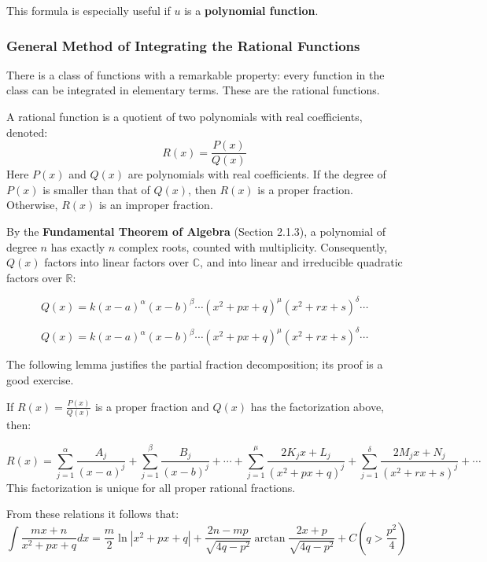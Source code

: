 This formula is especially useful if $u$ is a \textbf{polynomial function}.

\subsubsection{General Method of Integrating the Rational Functions}

There is a class of functions with a remarkable property: every function in the class can be integrated in elementary terms. These are the rational functions.

\begin{definition}
A rational function is a quotient of two polynomials with real coefficients, denoted:
\[
R(x) = \frac{P(x)}{Q(x)}
\]
Here $P(x)$ and $Q(x)$ are polynomials with real coefficients. If the degree of $P(x)$ is smaller than that of $Q(x)$, then $R(x)$ is a proper fraction. Otherwise, $R(x)$ is an improper fraction.
\end{definition}

By the \textbf{Fundamental Theorem of Algebra} (Section 2.1.3), a polynomial of degree $n$ has exactly $n$ complex roots, counted with multiplicity. Consequently, $Q(x)$ factors into linear factors over $\mathbb{C}$, and into linear and irreducible quadratic factors over $\mathbb{R}$:

\[
Q(x) = k (x-a)^{\alpha} (x-b)^{\beta} \cdots (x^2 + px + q)^{\mu} (x^2 + rx + s)^{\delta} \cdots
\]

\[
Q(x) = k (x-a)^{\alpha} (x-b)^{\beta} \cdots (x^2 + px + q)^{\mu} (x^2 + rx + s)^{\delta} \cdots
\]

The following lemma justifies the partial fraction decomposition; its proof is a good exercise.

\begin{lemma}
If $R(x) = \frac{P(x)}{Q(x)}$ is a proper fraction and $Q(x)$ has the factorization above, then:

\[
R(x) = \sum_{j=1}^{\alpha} \frac{A_j}{(x-a)^j} + \sum_{j=1}^{\beta} \frac{B_j}{(x-b)^j} + \cdots + \sum_{j=1}^{\mu} \frac{2K_jx + L_j}{(x^2 + px +q)^j} + \sum_{j=1}^{\delta} \frac{2M_jx + N_j}{(x^2 + rx +s)^j} + \cdots
\]
This factorization is unique for all proper rational fractions.
\end{lemma}

From these relations it follows that:
\[
\int \frac{mx+n}{x^2 + px + q} dx = \frac{m}{2} \ln |x^2 + px + q| + \frac{2n-mp}{\sqrt{4q - p^2}} \arctan \frac{2x + p}{\sqrt{4q - p^2}} + C (q > \frac{p^2}{4})
\]

